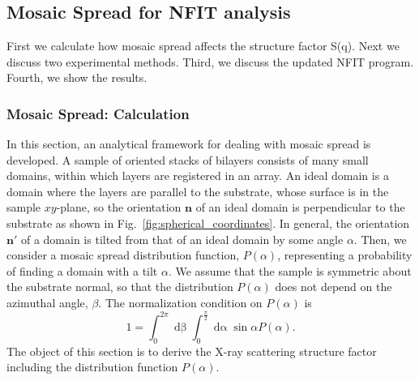 \chapter{}
\section{Mosaic Spread for NFIT analysis}
\label{sec:mosaic_spread}
First we calculate how mosaic spread affects the structure factor S(q). 
Next we discuss two experimental methods. Third, we discuss the updated NFIT program.
Fourth, we show the results.

\subsection{Mosaic Spread: Calculation}\label{app:mosaic_calc}
In this section, an analytical framework for dealing with mosaic spread is 
developed. A sample of oriented stacks of bilayers consists of many small domains, 
within which layers are registered in an array. 
An ideal domain is a domain where the layers are parallel to the substrate, whose
surface is in the sample $xy$-plane, so
the orientation $\mathbf{n}$ of an ideal domain is perpendicular
to the substrate as shown in Fig.~\ref{fig:spherical_coordinates}.
In general, the orientation $\mathbf{n'}$ of a domain is tilted from that of an
ideal domain by some angle $\alpha$. 
Then, we consider a mosaic spread distribution function, $P(\alpha)$, 
representing a probability of finding a domain with a tilt $\alpha$. 
We assume that the sample is symmetric about the substrate normal, 
so that the distribution $P(\alpha)$ does not depend on the azimuthal angle, $\beta$. 
The normalization condition on $P(\alpha)$ is 
\begin{equation}
  1 = \int_0^{2\pi}\mathop{d\beta}  
      \int_0^{\frac{\pi}{2}}\mathop{d\alpha}\sin\alpha P(\alpha).
\end{equation}
The object of this section is to derive the X-ray scattering structure factor 
including the distribution function $P(\alpha)$. 

